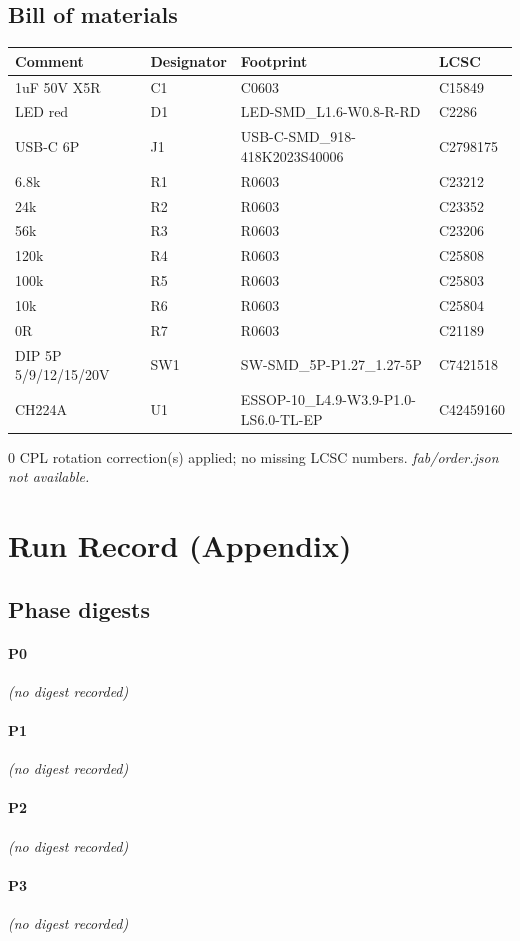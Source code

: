 \documentclass[11pt,a4paper]{article}
\begin{document}
\subsection*{Bill of materials}
{\small
\begin{longtable}{p{4.4cm}p{2.8cm}p{4.6cm}l}
\toprule
\textbf{Comment} & \textbf{Designator} & \textbf{Footprint} & \textbf{LCSC} \\
\midrule
\endhead
1uF 50V X5R & C1 & C0603 & C15849 \\
LED red & D1 & LED-SMD\_L1.6-W0.8-R-RD & C2286 \\
USB-C 6P & J1 & USB-C-SMD\_918-418K2023S40006 & C2798175 \\
6.8k & R1 & R0603 & C23212 \\
24k & R2 & R0603 & C23352 \\
56k & R3 & R0603 & C23206 \\
120k & R4 & R0603 & C25808 \\
100k & R5 & R0603 & C25803 \\
10k & R6 & R0603 & C25804 \\
0R & R7 & R0603 & C21189 \\
DIP 5P 5/9/12/15/20V & SW1 & SW-SMD\_5P-P1.27\_1.27-5P & C7421518 \\
CH224A & U1 & ESSOP-10\_L4.9-W3.9-P1.0-LS6.0-TL-EP & C42459160 \\
\bottomrule
\end{longtable}
}
0 CPL rotation correction(s) applied; no missing LCSC numbers.
\emph{fab/order.json not available.}
\section{Run Record (Appendix)}
\subsection*{Phase digests}
\paragraph*{P0}
\emph{(no digest recorded)}
\paragraph*{P1}
\emph{(no digest recorded)}
\paragraph*{P2}
\emph{(no digest recorded)}
\paragraph*{P3}
\emph{(no digest recorded)}
\end{document}
